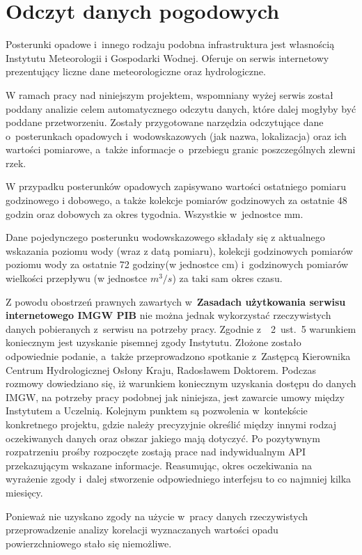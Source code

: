 \chapter{Odczyt danych pogodowych}
Posterunki opadowe i~innego rodzaju podobna infrastruktura jest własnością Instytutu Meteorologii i Gospodarki Wodnej. Oferuje on serwis internetowy prezentujący liczne dane meteorologiczne oraz hydrologiczne.

W ramach pracy nad niniejszym projektem, wspomniany wyżej serwis został poddany analizie celem automatycznego odczytu danych, które dalej mogłyby być poddane przetworzeniu. Zostały przygotowane narzędzia odczytujące dane o~posterunkach opadowych i~wodowskazowych (jak nazwa, lokalizacja) oraz ich wartości pomiarowe, a~także informacje o~przebiegu granic poszczególnych zlewni rzek.

W przypadku posterunków opadowych zapisywano wartości ostatniego pomiaru godzinowego i dobowego, a także kolekcje pomiarów godzinowych za ostatnie 48 godzin oraz dobowych za okres tygodnia. Wszystkie w~jednostce mm.

Dane pojedynczego posterunku wodowskazowego składały się z aktualnego wskazania poziomu wody (wraz z datą pomiaru), kolekcji godzinowych pomiarów poziomu wody za ostatnie 72 godziny(w jednostce cm) i~godzinowych pomiarów wielkości przepływu (w jednostce $m^3/s$) za taki sam okres czasu.


Z powodu obostrzeń prawnych zawartych w~\textbf{Zasadach użytkowania serwisu internetowego IMGW PIB} nie można jednak wykorzystać rzeczywistych danych pobieranych z~serwisu na potrzeby pracy. Zgodnie z~\textsection~2~ust.~5 warunkiem koniecznym jest uzyskanie pisemnej zgody Instytutu. Złożone zostało odpowiednie podanie, a~także przeprowadzono spotkanie z~Zastępcą Kierownika Centrum Hydrologicznej Osłony Kraju, Radosławem Doktorem. Podczas rozmowy dowiedziano się, iż warunkiem koniecznym uzyskania dostępu do danych IMGW, na potrzeby pracy podobnej jak niniejsza, jest zawarcie umowy między Instytutem a Uczelnią. Kolejnym punktem są pozwolenia w~kontekście konkretnego projektu, gdzie należy precyzyjnie określić między innymi rodzaj oczekiwanych danych oraz obszar jakiego mają dotyczyć. Po pozytywnym rozpatrzeniu prośby rozpoczęte zostają prace nad indywidualnym API przekazującym wskazane informacje. Reasumując, okres oczekiwania na wyrażenie zgody i~dalej stworzenie odpowiedniego interfejsu to co najmniej kilka miesięcy.

Ponieważ nie uzyskano zgody na użycie w~pracy danych rzeczywistych przeprowadzenie analizy korelacji wyznaczanych wartości opadu powierzchniowego stało się niemożliwe. 